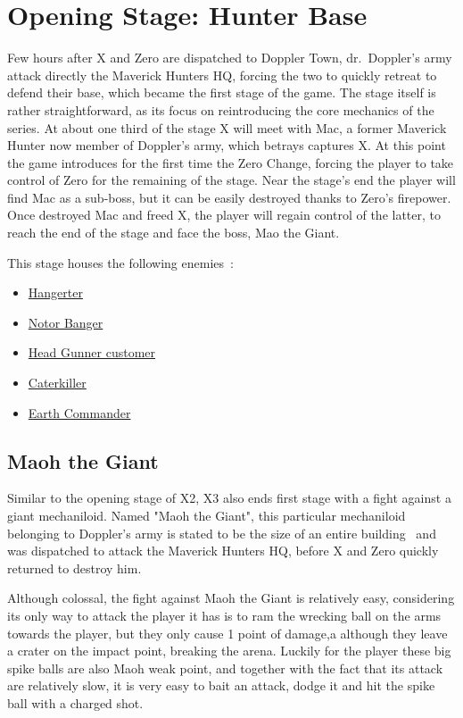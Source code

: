 \section{Opening Stage: Hunter Base}\label{X3:intro_stage}
Few hours after X and Zero are dispatched to Doppler Town, dr.~Doppler's army attack directly the Maverick Hunters HQ, forcing the two to quickly retreat to defend their base, which became the first stage of the game. The stage itself is rather straightforward, as its focus on reintroducing the core mechanics of the series. At about one third of the stage X will meet with Mac, a former Maverick Hunter now member of Doppler's army, which betrays captures X. At this point the game introduces for the first time the Zero Change, forcing the player to take control of Zero for the remaining of the stage. Near the stage's end the player will find Mac as a sub-boss, but it can be easily destroyed thanks to Zero's firepower. Once destroyed Mac and freed X, the player will regain control of the latter, to reach the end of the stage and face the boss, Mao the Giant.

This stage houses  the following enemies~\cite{wiki:X3_opening}:
\begin{itemize}
	\item \hyperlink{enem:Hangerter}{Hangerter}
	\item \hyperlink{enem:Notor_Banger}{Notor Banger}
	\item \hyperlink{enem:Head_Gunner_customer}{Head Gunner customer}
	\item \hyperlink{enem:Caterkiller}{Caterkiller}
	\item \hyperlink{enem:Earth_Commander}{Earth Commander}
\end{itemize}

\subsection{Maoh the Giant}\label{boss:Mao_the_giant}
Similar to the opening stage of X2, X3 also ends first stage with a fight against a giant mechaniloid. Named "Maoh the Giant", this particular mechaniloid belonging to Doppler's army is stated to be the size of an entire building~\cite{wayback:X3_resources} and was dispatched to attack the Maverick Hunters HQ, before X and Zero quickly returned to destroy him. 

Although colossal, the fight against Maoh the Giant is relatively easy, considering its only way to attack the player it has is to ram the wrecking ball on the arms towards the player, but they only cause 1 point of damage,a although they leave a crater on the impact point, breaking the arena. Luckily for the player these big spike balls are also Maoh weak point, and together with the fact that its attack are relatively slow, it is very easy to bait an attack, dodge it and hit the spike ball with a charged shot.

